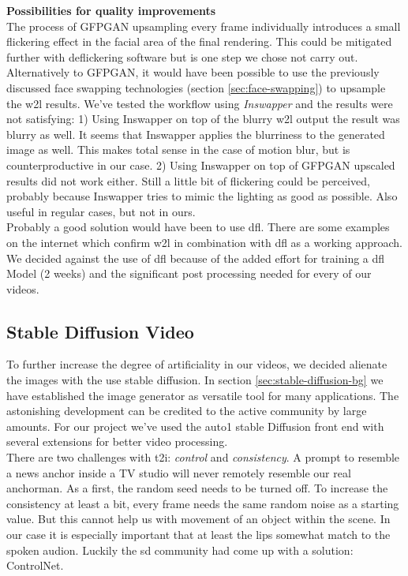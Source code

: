 \documentclass[
  a4paper,  %
  twoside,  %
  bibliography=totoc,
  headsepline,
  cleardoublepage=empty,
  parskip=half,
  draft=false
]{scrbook}
\begin{document}
\textbf{Possibilities for quality improvements} \\
The process of GFPGAN upsampling every frame individually introduces a small flickering effect in the facial area of the final rendering. This could be mitigated further with deflickering software but is one step we chose not carry out. \\ Alternatively to GFPGAN, it would have been possible to use the previously discussed face swapping technologies (section \ref{sec:face-swapping}) to upsample the \gls{w2l} results. We've tested the workflow using \textit{Inswapper} and the results were not satisfying: 1) Using Inswapper on top of the blurry \gls{w2l} output the result was blurry as well. It seems that Inswapper applies the blurriness to the generated image as well. This makes total sense in the case of motion blur, but is counterproductive in our case. 2) Using Inswapper on top of GFPGAN upscaled results did not work either. Still a little bit of flickering could be perceived, probably because Inswapper tries to mimic the lighting as good as possible. Also useful in regular cases, but not in ours. \\
Probably a good solution would have been to use \gls{dfl}. There are some examples on the internet which confirm \gls{w2l} in combination with \gls{dfl} as a working approach. We decided against the use of \gls*{dfl} because of the added effort for training a \gls{dfl} Model (2 weeks) and the significant post processing needed for every of our videos. 


\subsection{Stable Diffusion Video}
\label{sec:sd-video}
To further increase the degree of artificiality in our videos, we decided alienate the images with the use stable diffusion. In section \ref{sec:stable-diffusion-bg} we have established the image generator as versatile tool for many applications. The astonishing development can be credited to the active community by large amounts. For our project we've used the \gls{auto1} stable Diffusion front end with several extensions for better video processing. \\
There are two challenges with \gls{t2i}: \textit{control} and \textit{consistency}. A prompt to resemble a news anchor inside a TV studio will never remotely resemble our real anchorman. As a first, the random seed needs to be turned off. To increase the consistency at least a bit, every frame needs the same random noise as a starting value. But this cannot help us with movement of an object within the scene. In our case it is especially important that at least the lips somewhat match to the spoken audion. Luckily the \gls{sd} community had come up with a solution: ControlNet. 
\end{document}
